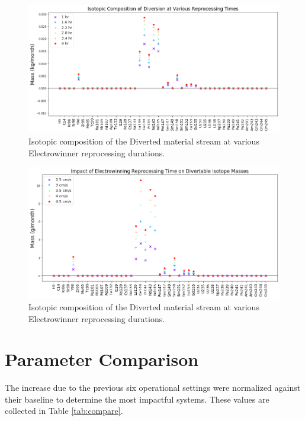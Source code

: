 \begin{figure}
	\includegraphics[width=\linewidth]{images/time-sa-comp}
	\caption{Isotopic composition of the Diverted material stream at various Electrowinner reprocessing durations.}
	\label{fig:win-time-sa}
\end{figure}

\begin{figure}
	\includegraphics[width=\linewidth]{images/time-sa-diff}
	\caption{Isotopic composition of the Diverted material stream at various Electrowinner reprocessing durations.}
	\label{fig:win-time-diff}
\end{figure}

\section{Parameter Comparison}

The increase due to the previous six operational settings were normalized against their baseline
to determine the most impactful systems. These values are collected in Table \ref{tab:compare}.

